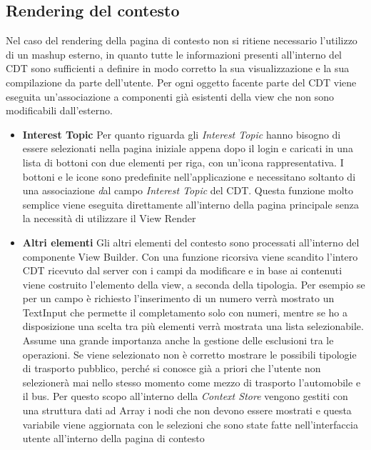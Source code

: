 \subsection{Rendering del contesto}

Nel caso del rendering della pagina di contesto non si ritiene necessario l'utilizzo di un mashup esterno, in quanto tutte le informazioni presenti all'interno del CDT sono sufficienti a definire in modo corretto la sua visualizzazione e la sua compilazione da parte dell'utente.
Per ogni oggetto facente parte del CDT viene eseguita un'associazione a componenti già esistenti della view che non sono modificabili dall'esterno.

\begin{itemize}
	\item \textbf{Interest Topic}
	Per quanto riguarda gli \emph{Interest Topic} hanno bisogno di essere selezionati nella pagina iniziale appena dopo il login e caricati in una lista di bottoni con due elementi per riga, con un'icona rappresentativa. I bottoni e le icone sono predefinite nell'applicazione e necessitano soltanto di una associazione \emph<nome, elemento> dal campo \emph{Interest Topic} del CDT. Questa funzione molto semplice viene eseguita direttamente all'interno della pagina principale senza la necessità di utilizzare il View Render
	\item \textbf{Altri elementi}
	Gli altri elementi del contesto sono processati all'interno del componente View Builder. Con una funzione ricorsiva viene scandito l'intero CDT ricevuto dal server con i campi da modificare e in base ai contenuti viene costruito l'elemento della view, a seconda della tipologia. Per esempio se per un campo è richiesto l'inserimento di un numero verrà mostrato un TextInput che permette il completamento solo con numeri, mentre se ho a disposizione una scelta tra più elementi verrà mostrata una lista selezionabile.
	Assume una grande importanza anche la gestione delle esclusioni tra le operazioni. Se viene selezionato  non è corretto mostrare le possibili tipologie di trasporto pubblico, perché si conosce già a priori che l'utente non selezionerà mai nello stesso momento come mezzo di trasporto l'automobile e il bus. Per questo scopo all'interno della \emph{Context Store} vengono gestiti con una struttura dati ad Array i nodi che non devono essere mostrati e questa variabile viene aggiornata con le selezioni che sono state fatte nell'interfaccia utente all'interno della pagina di contesto
\end{itemize}
	
